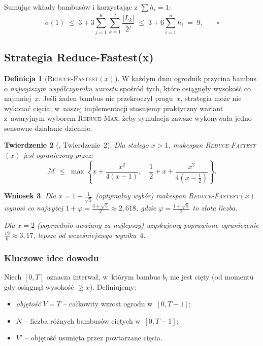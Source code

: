 \documentclass[12pt,a4paper]{article}
\theoremstyle{plain}
\newtheorem{twierdzenie}{Twierdzenie}[section]
\newtheorem{wniosek}[twierdzenie]{Wniosek}
\theoremstyle{definition}
\newtheorem{definicja}[twierdzenie]{Definicja}
\theoremstyle{remark}
\newcommand{\makespan}{\mathcal{M}}
\newcommand{\RF}{\textsc{Reduce-Fastest}}
\newcommand{\RM}{\textsc{Reduce-Max}}
\begin{document}
Sumując wkłady bambusów i korzystając z $\sum h_i = 1$:
\[
  \sigma(1) \;\leq\; 3 + 3\sum_{j=1}^{K}\sum_{k=1}^{j}\frac{|L_k|}{2^j}
             \;\leq\; 3 + 6\sum_{i=1}^{n} h_i \;=\; 9. \qquad \square
\]

\subsection{Strategia Reduce-Fastest(x)}

\begin{definicja}[\RF$(x)$]
W każdym dniu ogrodnik przycina bambus o \emph{najwyższym współczynniku wzrostu}
spośród tych, które osiągnęły wysokość co najmniej~$x$. Jeśli żaden bambus
nie przekroczył progu~$x$, strategia może nie wykonać cięcia; w~naszej
implementacji stosujemy praktyczny wariant z~awaryjnym wyborem \RM{},
żeby symulacja zawsze wykonywała jedno sensowne działanie dziennie.
\end{definicja}

\begin{twierdzenie}[\cite{bilo2022}, Twierdzenie~2]\label{thm:rf}
Dla stałego $x > 1$, makespan \RF$(x)$ jest ograniczony przez:
\[
  \makespan \;\leq\; \max\!\left\{
    x + \frac{x^2}{4(x-1)},\quad
    \frac{1}{2} + x + \frac{x^2}{4\!\left(x - \tfrac{1}{2}\right)}
  \right\}.
\]
\end{twierdzenie}

\begin{wniosek}\label{cor:golden}
Dla $x = 1 + \tfrac{1}{\sqrt{5}}$ (optymalny wybór) makespan \RF$(x)$ wynosi
co najwyżej $1 + \varphi = \tfrac{3+\sqrt{5}}{2} \approx 2{,}618$,
gdzie $\varphi = \tfrac{1+\sqrt{5}}{2}$ to złota liczba.

Dla $x = 2$ (poprzednio uważany za najlepszy) uzyskujemy poprawione
ograniczenie $\tfrac{19}{6} \approx 3{,}17$, lepsze od wcześniejszego
wyniku~$4$.
\end{wniosek}

\subsubsection{Kluczowe idee dowodu}

Niech $[0, T]$ oznacza interwał, w~którym bambus $b_i$ nie jest cięty
(od momentu gdy osiągnął wysokość $\geq x$). Definiujemy:
\begin{itemize}[noitemsep]
  \item \emph{objętość} $V = T$ – całkowity wzrost ogrodu w~$[0,T-1]$;
  \item $N$ – liczba różnych bambusów ciętych w~$[0,T-1]$;
  \item $V'$ – objętość usunięta przez powtarzane cięcia.
\end{itemize}
\end{document}
